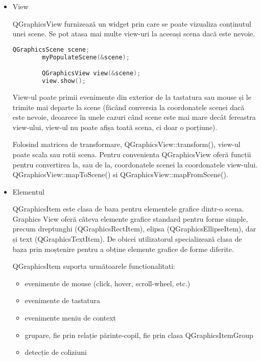 \begin{itemize}
    \item View
    
    QGraphicsView furnizează un widget prin care se poate vizualiza conținutul unei scene. Se pot atasa mai multe view-uri la 
    aceeași scena dacă este nevoie. 

    \begin{lstlisting}[language=C++]
        QGraphicsScene scene;
        myPopulateScene(&scene);

        QGraphicsView view(&scene);
        view.show();

    \end{lstlisting}

    View-ul poate primii evenimente din exterior de la tastatura sau mouse și le trimite mai departe la scene 
    (făcând conversia la coordonatele scenei dacă este nevoie, deoarece în unele cazuri când scene este mai mare 
    decât fereastra view-ului, view-ul nu poate afișa toată scena, ci doar o porțiune).\newline
    
    Folosind matricea de transformare, QGraphicsView::transform(), view-ul poate scala sau rotii scena. 
    Pentru convenienta QGraphicsView oferă funcții pentru convertirea la, sau de la, coordonatele scenei la 
    coordonatele view-ului. QGraphicsView::mapToScene() si QGraphicsView::mapFromScene().\newline

    \item Elementul
    
    QGraphicsItem este clasa de baza pentru elementele grafice dintr-o scena. Graphics View oferă câteva elemente grafice 
    standard pentru forme simple, precum dreptunghi  (QGraphicsRectItem), elipsa (QGraphicsEllipseItem), dar și text 
    (QGraphicsTextItem). De obicei utilizatorul specializează clasa de baza prin moștenire pentru a obține elemente 
    grafice de forme diferite.\newline

    QGraphicsItem suporta următoarele functionalitati:
    \begin{itemize}
        \item evenimente de mouse (click, hover, scroll-wheel, etc.)
        \item evenimente de tastatura
        \item evenimente meniu de context
        \item grupare, fie prin relație părinte-copil, fie prin clasa QGraphicsItemGroup
        \item detecție de coliziuni
    \end{itemize}


\end{itemize}

